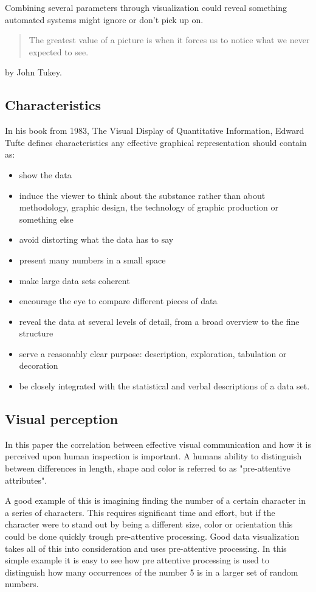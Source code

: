 Combining several parameters through visualization could reveal something automated systems might ignore or don't pick up on. \begin{quotation}
The greatest value of a picture is when it forces us to notice what we never expected to see.
\end{quotation} by John Tukey.

\subsection{Characteristics}
\label{characteristics}
In his book from 1983, The Visual Display of Quantitative Information\cite{tufte}, Edward Tufte defines characteristics any effective graphical representation should contain as:

\begin{itemize}
\item show the data
\item induce the viewer to think about the substance rather than about methodology, graphic design, the technology of graphic production or something else
\item avoid distorting what the data has to say
\item present many numbers in a small space
\item make large data sets coherent
\item encourage the eye to compare different pieces of data
\item reveal the data at several levels of detail, from a broad overview to the fine structure
\item serve a reasonably clear purpose: description, exploration, tabulation or decoration
\item be closely integrated with the statistical and verbal descriptions of a data set.
\end{itemize}

\subsection{Visual perception}
In this paper the correlation between effective visual communication and how it is perceived upon human inspection is important. A humans ability to distinguish between differences in length, shape and color is referred to as "pre-attentive attributes".  

A good example of this is imagining finding the number of a certain character in a series of characters. This requires significant time and effort, but if the character were to stand out by being a different size, color or orientation this could be done quickly trough pre-attentive processing. Good data visualization takes all of this into consideration and uses pre-attentive processing. In this simple example it is easy to see how pre attentive processing is used to distinguish how many occurrences of the number 5 is in a larger set of random numbers. 
\newline

